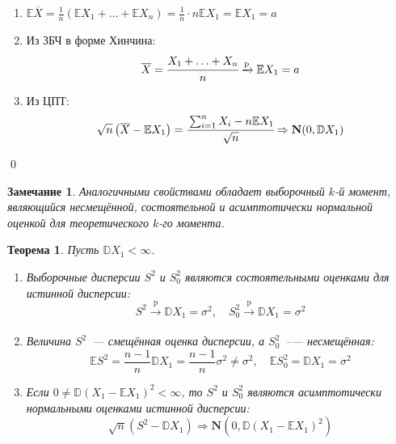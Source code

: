 \documentclass[oneside,final,14pt]{extreport}
\renewenvironment{proof}{{\bfseries Доказательство.}}{\qed}
\newtheorem{thm}{Теорема}[section]
\newtheorem*{rmrk}{Замечание}
\theoremstyle{definition}
\begin{document}
\begin{proof}
\begin{enumerate}[label={\arabic*.}]
    \item $\mathbb{E} \overline{X}=\frac{1}{n}(\mathbb{E} X_{1}+\ldots+\mathbb{E} X_{n})=\frac{1}{n} \cdot n \mathbb{E} X_{1}=\mathbb{E} X_{1}=a$
    \item Из ЗБЧ в форме Хинчина:
    \begin{equation*}
        \overline{X}
        = \cfrac{X_{1}+\ldots+X_{n}}{n} \xrightarrow[]{\mathrm{p}} \mathbb{E} X_{1} 
        = a
    \end{equation*}

    \item Из ЦПТ:
    \begin{equation*}
        \sqrt{n}\left(\overline{X}-\mathbb{E} X_{1}\right) 
        = \cfrac{\sum_{i=1}^{n} X_{i}-n \mathbb{E} X_{1}}{\sqrt{n}} 
        \Rightarrow \mathbf{N}(0, \mathbb{D} X_{1})
    \end{equation*}
\end{enumerate}
\end{proof}

\begin{rmrk}
    Аналогичными свойствами обладает выборочный $k$-й момент, являющийся несмещённой, состоятельной и асимптотически нормальной оценкой для теоретического $k$-го момента.
\end{rmrk}

\begin{thm}
Пусть $\mathbb{D} X_{1}<\infty$.
\begin{enumerate}
    \item Выборочные дисперсии $S^{2}$ и $S^{2}_0$ являются состоятельными оценками для истинной дисперсии:
    \begin{equation*}
        S^{2} \xrightarrow[]{\mathrm{p}} \mathbb{D} X_{1}=\sigma^{2}, \quad S_{0}^{2} \xrightarrow[]{\mathrm{p}} \mathbb{D} X_{1}=\sigma^{2}
    \end{equation*}
    \item Величина $S^{2}$~--- смещённая оценка дисперсии, а $S^{2}_0$~--— несмещённая:
    \begin{equation*}
        \mathbb{E} S^{2}=\frac{n-1}{n} \mathbb{D} X_{1}=\frac{n-1}{n} \sigma^{2} \neq \sigma^{2}, \quad \mathbb{E} S_{0}^{2}=\mathbb{D} X_{1}=\sigma^{2}
    \end{equation*}
    
    \item Если $0 \neq \mathbb{D}(X_{1}-\mathbb{E}X_{1})^{2}<\infty$, то $S^{2}$ и $S^{2}_0$ являются асимптотически нормальными оценками истинной дисперсии:
    \begin{equation*}
        \sqrt{n}\left(S^{2}-\mathbb{D} X_{1}\right) \Rightarrow \mathbf{N}(0, \mathbb{D}(X_{1}-\mathbb{E} X_{1})^{2})
    \end{equation*}
\end{enumerate}
\end{thm}
\end{document}
